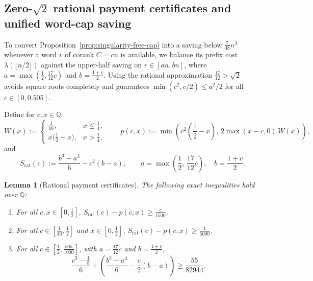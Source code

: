 \documentclass[11pt]{article}
\newtheorem{lemma}[theorem]{Lemma}
\theoremstyle{definition}
\theoremstyle{remark}
\newcommand{\Q}{\mathbb{Q}}
\begin{document}
\subsection{Zero-\texorpdfstring{$\sqrt{2}$}{sqrt(2)} rational payment certificates and unified word-cap saving}\label{sec:payment}

To convert Proposition~\ref{prop:singularity-free-cap} into a saving below $\frac{7}{48} n^3$ whenever a word $v$ of corank $C = c n$ is available, we balance its prefix cost $\lambda(\lfloor n/2 \rfloor)$ against the upper-half saving on $r \in [a n, b n]$, where $a = \max(\frac{1}{2}, \frac{17}{12} c)$ and $b = \frac{1 + c}{2}$. Using the rational approximation $\frac{17}{12} > \sqrt{2}$ avoids square roots completely and guarantees $\min(c^2, c/2) \le a^2 / 2$ for all $c \in [0, 0.505]$.

Define for $c, x \in \Q$:
\[
  W(x) := \begin{cases} \frac{1}{16}, & x \le \frac{1}{4}, \\ x\bigl(\frac{1}{2} - x\bigr), & x > \frac{1}{4}, \end{cases}
  \qquad
  p(c, x) := \min\!\left(c^2 \left(\frac{1}{2} - x\right),\, 2 \max(x - c, 0)\, W(x)\right),
\]
and
\[
  S_{\mathrm{rat}}(c) := \frac{b^3 - a^3}{6} - c^2(b - a),
  \qquad a = \max\!\left(\frac{1}{2},\, \frac{17}{12} c\right),\quad b = \frac{1 + c}{2}.
\]

\begin{lemma}[Rational payment certificates]\label{lem:rational-payment}
The following exact inequalities hold over $\Q$:
\begin{enumerate}[label=(\alph*), leftmargin=2em]
  \item For all $c, x \in [0, \frac{1}{2}]$, $S_{\mathrm{rat}}(c) - p(c, x) \ge \frac{c}{1500}$.
  \item For all $c \in [\frac{1}{10}, \frac{1}{2}]$ and $x \in [0, \frac{1}{2}]$, $S_{\mathrm{rat}}(c) - p(c, x) \ge \frac{1}{5000}$.
  \item For all $c \in [\frac{1}{2}, \frac{505}{1000}]$, with $a = \frac{17}{12} c$ and $b = \frac{1+c}{2}$,
  \[
    \frac{c^3 - \frac{1}{8}}{6} + \left(\frac{b^3 - a^3}{6} - \frac{c}{2}(b - a)\right) \ge \frac{55}{82944}.
  \]
\end{enumerate}
\end{lemma}
\end{document}
